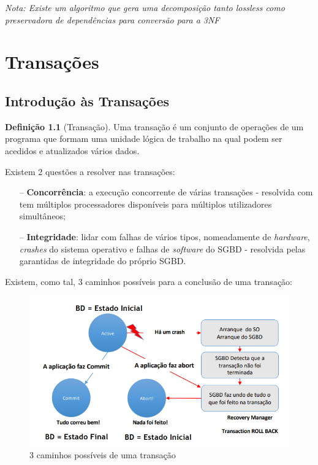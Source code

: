 \documentclass[oneside]{book}
\theoremstyle{definition}
\newtheorem{definition}{Definição}
\begin{document}
 \textit{Nota: Existe um algoritmo que gera uma decomposição tanto lossless como preservadora de dependências para conversão para a 3NF}






\chapter{Transações}
\section{Introdução às Transações}
\begin{definition}[Transação]
    Uma transação é um conjunto de operações de um programa que formam uma unidade lógica de trabalho na qual podem ser acedidos e atualizados vários dados.
\end{definition}
Existem 2 questões a resolver nas transações:
\begin{itemize}
    \itemsep0cm
    \item[--] \textbf{Concorrência}: a execução concorrente de várias transações - resolvida com tem múltiplos processadores disponíveis para múltiplos utilizadores simultâneos;
    \item[--] \textbf{Integridade}: lidar com falhas de vários tipos, nomeadamente de \textit{hardware}, \textit{crashes} do sistema operativo e falhas de \textit{software} do SGBD - resolvida pelas garantidas de integridade do próprio SGBD.
\end{itemize}

Existem, como tal, 3 caminhos possíveis para a conclusão de uma transação:
\begin{figure}[H]
    \centering
    \includegraphics[scale = 0.4]{cap_transct/caminhos_transacoes.png}
    \caption{3 caminhos possíveis de uma transação}
\end{figure}
\end{document}

